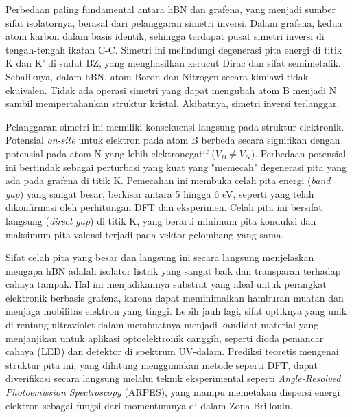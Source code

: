 Perbedaan paling fundamental antara hBN dan grafena, yang menjadi sumber sifat isolatornya, berasal dari pelanggaran simetri inversi. Dalam grafena, kedua atom karbon dalam basis identik, sehingga terdapat pusat simetri inversi di tengah-tengah ikatan C-C. Simetri ini melindungi degenerasi pita energi di titik K dan K' di sudut BZ, yang menghasilkan kerucut Dirac dan sifat semimetalik. Sebaliknya, dalam hBN, atom Boron dan Nitrogen secara kimiawi tidak ekuivalen. Tidak ada operasi simetri yang dapat mengubah atom B menjadi N sambil mempertahankan struktur kristal. Akibatnya, simetri inversi terlanggar.

Pelanggaran simetri ini memiliki konsekuensi langsung pada struktur elektronik. Potensial \emph{on-site} untuk elektron pada atom B berbeda secara signifikan dengan potensial pada atom N yang lebih elektronegatif ($V_B \neq V_N$). Perbedaan potensial ini bertindak sebagai perturbasi yang kuat yang "memecah" degenerasi pita yang ada pada grafena di titik K. Pemecahan ini membuka celah pita energi (\emph{band gap}) yang sangat besar, berkisar antara 5 hingga 6 eV, seperti yang telah dikonfirmasi oleh perhitungan DFT dan eksperimen. Celah pita ini bersifat langsung (\emph{direct gap}) di titik K, yang berarti minimum pita konduksi dan maksimum pita valensi terjadi pada vektor gelombang yang sama.

Sifat celah pita yang besar dan langsung ini secara langsung menjelaskan mengapa hBN adalah isolator listrik yang sangat baik dan transparan terhadap cahaya tampak. Hal ini menjadikannya substrat yang ideal untuk perangkat elektronik berbasis grafena, karena dapat meminimalkan hamburan muatan dan menjaga mobilitas elektron yang tinggi. Lebih jauh lagi, sifat optiknya yang unik di rentang ultraviolet dalam membuatnya menjadi kandidat material yang menjanjikan untuk aplikasi optoelektronik canggih, seperti dioda pemancar cahaya (LED) dan detektor di spektrum UV-dalam. Prediksi teoretis mengenai struktur pita ini, yang dihitung menggunakan metode seperti DFT, dapat diverifikasi secara langsung melalui teknik eksperimental seperti \emph{Angle-Resolved Photoemission Spectroscopy} (ARPES), yang mampu memetakan dispersi energi elektron sebagai fungsi dari momentumnya di dalam Zona Brillouin.

